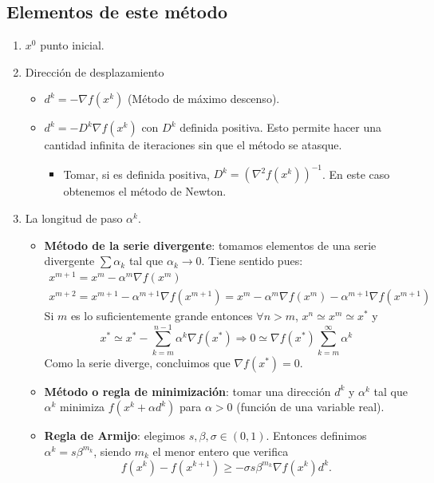 \documentclass[MIOP.tex]{subfiles}
\begin{document}
\subsection{Elementos de este método}
\begin{enumerate}
\item $x^0$ punto inicial.
\item Dirección de desplazamiento
\begin{itemize}
\item $d^k = -\nabla f(x^k)$ (Método de máximo descenso).
\item $d^k = -D^k \nabla f(x^k)$ con $D^k$ definida positiva. Esto permite hacer una cantidad infinita de iteraciones sin que el método se atasque.
\begin{itemize}
\item Tomar, si es definida positiva, $D^k = (\nabla^2 f(x^k))^{-1}$. En este caso obtenemos el método de Newton.
\end{itemize}
\end{itemize}
\item La longitud de paso $\alpha^k$.
\begin{itemize}
\item \textbf{Método de la serie divergente}: tomamos elementos de una serie divergente $\sum \alpha_k$ tal que $\alpha_k \rightarrow 0$. Tiene sentido pues:
\begin{gather*}
x^{m+1} = x^m - \alpha^m \nabla f(x^{m})\\
 x^{m+2} = x^{m+1} - \alpha^{m+1} \nabla f(x^{m+1}) =  x^m - \alpha^m \nabla f(x^{m}) -\alpha^{m+1} \nabla f(x^{m+1})
\end{gather*}
Si $m$ es lo suficientemente grande entonces $\forall n>m$, $x^n \simeq x^m \simeq x^*$ y
\[
x^* \simeq x^* - \sum^{n-1}_{k=m} \alpha^k \nabla f(x^*) \Rightarrow 0 \simeq \nabla f(x^*)\sum_{k=m}^\infty \alpha^k
\]
Como la serie diverge, concluimos que $\nabla f(x^*)=0$.
\item \textbf{Método o regla de minimización}: tomar una dirección $d^k$ y $\alpha^k$ tal que $\alpha^k$ minimiza $f(x^k+\alpha d^k)$ para $\alpha>0$ (función de una variable real).
\item \textbf{Regla de Armijo}: elegimos $s,\beta,\sigma\in (0,1)$. Entonces definimos $\alpha^k=s\beta^{m_k}$, siendo $m_k$ el menor entero que verifica
$$f(x^k)-f(x^{k+1})\geq -\sigma s\beta^{m_k}\nabla f(x^k)d^k.$$
\end{itemize}
\end{enumerate}
\end{document}
